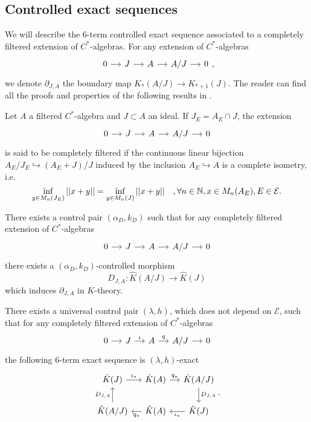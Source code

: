 \subsection{Controlled exact sequences}
We will describe the $6$-term controlled exact sequence associated to a completely filtered extension of $C^*$-algebras. For any extension of $C^*$-algebras 
\[\begin{tikzcd}[column sep = small]0\arrow{r} & J\arrow{r} & A\arrow{r} & A/J\arrow{r} & 0 \end{tikzcd},\]
we denote $\partial_{J,A}$ the boundary map $K_*(A/J)\rightarrow K_{*+1}(J)$. The reader can find all the proofs and properties of the following results in \cite{OY2}.

\begin{definition}
Let $A$ a filtered $C^*$-algebra and $J\subset A$ an ideal. If $J_E = A_E\cap J$, the extension
\[\begin{tikzcd}[column sep = small]0\arrow{r} & J\arrow{r} & A\arrow{r} & A/J\arrow{r} & 0 \end{tikzcd}\]
is said to be completely filtered if the continuous linear bijection $A_E/J_E \hookrightarrow (A_E+J)/J$ induced by the inclusion $A_E\hookrightarrow A$ is a complete isometry, i.e.
\[ \inf_{y\in M_n(J_E)} ||x+y|| = \inf_{y\in M_n(J)} ||x+y||\quad,\forall n\in \mathbb N,x\in M_n(A_E),E\in \mathcal E.\]
\end{definition}

\begin{prop}
There exists a control pair $(\alpha_D,k_D)$ such that for any completely filtered extension of $C^*$-algebras
\[\begin{tikzcd}[column sep = small]0\arrow{r} & J\arrow{r} & A\arrow{r} & A/J\arrow{r} & 0 \end{tikzcd}\]
there exists a $(\alpha_D,k_D)$-controlled morphism 
\[D_{J,A} : \hat K(A/J)\rightarrow \hat K(J)\]
which induces $\partial_{J,A}$ in $K$-theory.
\end{prop}

\begin{thm}
There exists a universal control pair $(\lambda,h)$, which does not depend on $\mathcal E$, such that for any completely filtered extension of $C^*$-algebras 
\[\begin{tikzcd}[column sep = small]0\arrow{r} & J\arrow{r}{\iota} & A\arrow{r}{q} & A/J\arrow{r} & 0 \end{tikzcd}\]
the following $6$-term exact sequence is $(\lambda,h)$-exact
\[\begin{tikzcd}[column sep = small]
 \hat K(J) \arrow{r}{\iota_*} & \hat K(A) \arrow{r}{q_*} & \hat K(A/J)\arrow{d}{D_{J,A}} \\
 \hat K(A/J) \arrow{u}{D_{J,A}} & \hat K(A) \arrow{l}{q_*} & \hat K(J)\arrow{l}{\iota_*}
\end{tikzcd}.\]
\end{thm}

